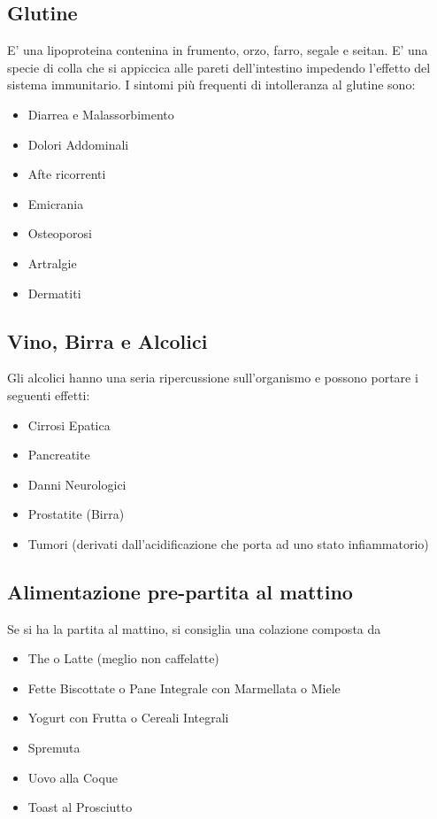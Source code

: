 \documentclass[../uefaC.tex]{subfiles}
\begin{document}
\subsection{Glutine}
E' una lipoproteina contenina in frumento, orzo, farro, segale e seitan. E' una specie di colla che si appiccica alle pareti dell'intestino impedendo l'effetto del sistema immunitario. I sintomi più frequenti di intolleranza al glutine sono:
\begin{itemize}
        \item Diarrea e Malassorbimento
        \item Dolori Addominali
        \item Afte ricorrenti
        \item Emicrania
        \item Osteoporosi
        \item Artralgie
        \item Dermatiti
\end{itemize}

\subsection{Vino, Birra e Alcolici}
Gli alcolici hanno una seria ripercussione sull'organismo e possono portare i seguenti effetti:
\begin{itemize}
    \item Cirrosi Epatica
    \item Pancreatite
    \item Danni Neurologici
    \item Prostatite (Birra)
    \item Tumori (derivati dall'acidificazione che porta ad uno stato infiammatorio)
\end{itemize}

\subsection{Alimentazione pre-partita al mattino}
Se si ha la partita al mattino, si consiglia una colazione composta da
\begin{itemize}
    \item The o Latte (meglio non caffelatte)
    \item Fette Biscottate o Pane Integrale con Marmellata o Miele
    \item Yogurt con Frutta o Cereali Integrali
    \item Spremuta
    \item Uovo alla Coque 
    \item Toast al Prosciutto
\end{itemize}
\end{document}
